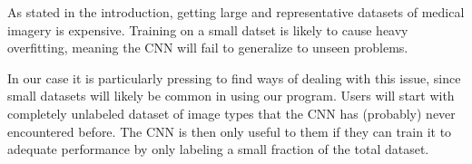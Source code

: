 As stated in the introduction, getting large and representative datasets of medical imagery is expensive. Training on a small datset is likely to cause heavy overfitting, meaning the CNN will fail to generalize to unseen problems. 

In our case it is particularly pressing to find ways of dealing with this issue, since small datasets will likely be common in using our program. Users will start with completely unlabeled dataset of image types that the CNN has (probably) never encountered before. The CNN is then only useful to them if they can train it to adequate performance by only labeling a small fraction of the total dataset. 
